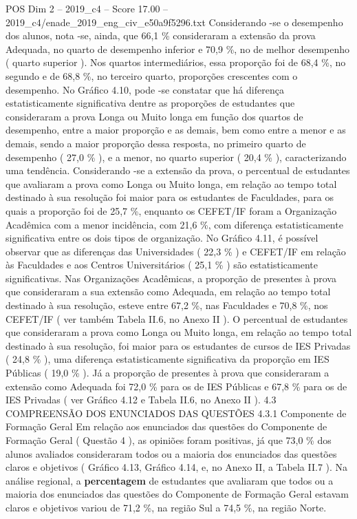 \begin{textsample}{POS Dim 2 – 2019\_c4 – Score 17.00 – 2019\_c4/enade\_2019\_eng\_civ\_e50a9f5296.txt}
Considerando -se o desempenho dos alunos, nota -se, ainda, que 66,1 \% consideraram a extensão da prova Adequada, no quarto de desempenho inferior e 70,9 \%, no de melhor desempenho ( quarto superior ).
Nos quartos intermediários, essa proporção foi de 68,4 \%, no segundo e de 68,8 \%, no terceiro quarto, proporções crescentes com o desempenho.
No Gráfico 4.10, pode -se constatar que há diferença estatisticamente significativa dentre as proporções de estudantes que consideraram a prova Longa ou Muito longa em função dos quartos de desempenho, entre a maior proporção e as demais, bem como entre a menor e as demais, sendo a maior proporção dessa resposta, no primeiro quarto de desempenho ( 27,0 \% ), e a menor, no quarto superior ( 20,4 \% ), caracterizando uma tendência.
Considerando -se a extensão da prova, o percentual de estudantes que avaliaram a prova como Longa ou Muito longa, em relação ao tempo total destinado à sua resolução foi maior para os estudantes de Faculdades, para os quais a proporção foi de 25,7 \%, enquanto os CEFET/IF foram a Organização Acadêmica com a menor incidência, com 21,6 \%, com diferença estatisticamente significativa entre os dois tipos de organização.
No Gráfico 4.11, é possível observar que as diferenças das Universidades ( 22,3 \% ) e CEFET/IF em relação às Faculdades e aos Centros Universitários ( 25,1 \% ) são estatisticamente significativas.
Nas Organizações Acadêmicas, a proporção de presentes à prova que consideraram a sua extensão como Adequada, em relação ao tempo total destinado à sua resolução, esteve entre 67,2 \%, nas Faculdades e 70,8 \%, nos CEFET/IF ( ver também Tabela II.6, no Anexo II ).
O percentual de estudantes que consideraram a prova como Longa ou Muito longa, em relação ao tempo total destinado à sua resolução, foi maior para os estudantes de cursos de IES Privadas ( 24,8 \% ), uma diferença estatisticamente significativa da proporção em IES Públicas ( 19,0 \% ).
Já a proporção de presentes à prova que consideraram a extensão como Adequada foi 72,0 \% para os de IES Públicas e 67,8 \% para os de IES Privadas ( ver Gráfico 4.12 e Tabela II.6, no Anexo II ). 4.3 COMPREENSÃO DOS ENUNCIADOS DAS QUESTÕES 4.3.1 Componente de Formação Geral Em relação aos enunciados das questões do Componente de Formação Geral ( Questão 4 ), as opiniões foram positivas, já que 73,0 \% dos alunos avaliados consideraram todos ou a maioria dos enunciados das questões claros e objetivos ( Gráfico 4.13, Gráfico 4.14, e, no Anexo II, a Tabela II.7 ).
Na análise regional, a \textbf{percentagem} de estudantes que avaliaram que todos ou a maioria dos enunciados das questões do Componente de Formação Geral estavam claros e objetivos variou de 71,2 \%, na região Sul a 74,5 \%, na região Norte.

\end{textsample}
